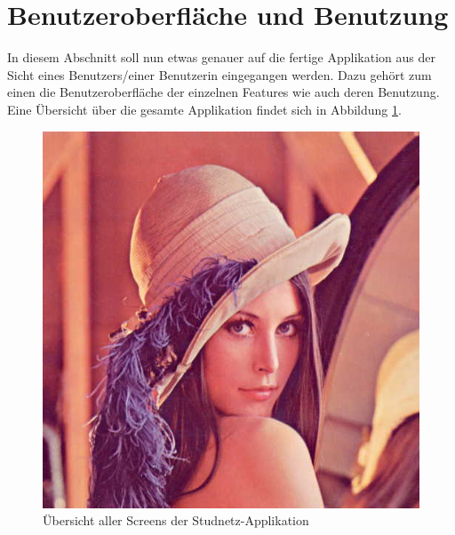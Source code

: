 \documentclass[../main.tex]{subfiles}
\begin{document}
\section{Benutzeroberfläche und Benutzung}%
In diesem Abschnitt soll nun etwas genauer auf die fertige Applikation aus der Sicht eines Benutzers/einer Benutzerin eingegangen werden. Dazu gehört zum einen die Benutzeroberfläche der einzelnen Features wie auch deren Benutzung. Eine Übersicht über die gesamte Applikation findet sich in Abbildung \ref{overview}.
\begin{figure} 
	\centering
	\includegraphics[width=\textwidth, height=0.95\textheight]{./images/lena.jpg}
	\caption{Übersicht aller Screens der Studnetz-Applikation}
	\label{overview}
\end{figure}
\end{document}
